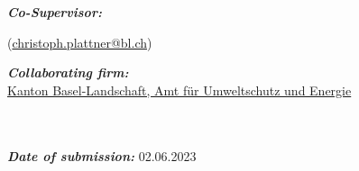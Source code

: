 \documentclass[
11pt, %
oneside, %
english, %
onehalfspacing, %
headsepline, %
chapterinoneline, %
]{../hslu} %
\begin{document}
\begin{titlepage}
\begin{center}
\emph{\textbf{Co-Supervisor:}} \\
\examname %

(\href{mailto:christoph.plattner@bl.ch}{christoph.plattner@bl.ch})

\vspace{4mm}
\emph{\textbf{Collaborating firm:}} \\
\href{https://www.baselland.ch/politik-und-behorden/direktionen/bau-und-umweltschutzdirektion/umweltschutz-energie}{Kanton Basel-Landschaft, Amt für Umweltschutz und Energie} 


\vspace{8mm}


\groupname\\\deptname\\[1cm] %
 

\textbf{\textit{Date of submission:}} 02.06.2023\\[2cm] %
 

\end{center}
\end{titlepage}
\end{document}
